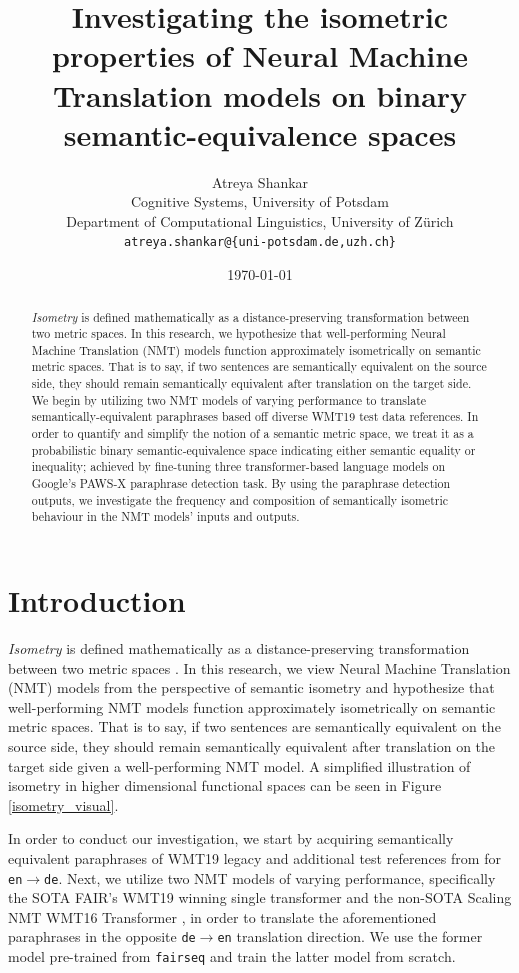 \documentclass[11pt,a4paper]{article}
\title{Investigating the isometric properties of Neural Machine Translation models on binary semantic-equivalence spaces}
\author{Atreya Shankar \\
  Cognitive Systems, University of Potsdam \\
  Department of Computational Linguistics, University of Zürich \\
  \texttt{atreya.shankar@\{uni-potsdam.de,uzh.ch\}}}
\date{\today}
\begin{document}
\maketitle

\begin{abstract}
  \textit{Isometry} is defined mathematically as a distance-preserving transformation between two metric spaces. In this research, we hypothesize that well-performing Neural Machine Translation (NMT) models function approximately isometrically on semantic metric spaces. That is to say, if two sentences are semantically equivalent on the source side, they should remain semantically equivalent after translation on the target side. We begin by utilizing two NMT models of varying performance to translate semantically-equivalent paraphrases based off diverse WMT19 test data references. In order to quantify and simplify the notion of a semantic metric space, we treat it as a probabilistic binary semantic-equivalence space indicating either semantic equality or inequality; achieved by fine-tuning three transformer-based language models on Google's PAWS-X paraphrase detection task. By using the paraphrase detection outputs, we investigate the frequency and composition of semantically isometric behaviour in the NMT models' inputs and outputs.
\end{abstract}

\section{Introduction}

\textit{Isometry} is defined mathematically as a distance-preserving transformation between two metric spaces \cite{coxeter1961introduction}. In this research, we view Neural Machine Translation (NMT) models from the perspective of semantic isometry and hypothesize that well-performing NMT models function approximately isometrically on semantic metric spaces. That is to say, if two sentences are semantically equivalent on the source side, they should remain semantically equivalent after translation on the target side given a well-performing NMT model. A simplified illustration of isometry in higher dimensional functional spaces can be seen in Figure \ref{isometry_visual}.

In order to conduct our investigation, we start by acquiring semantically equivalent paraphrases of WMT19 legacy and additional test references from \citet{freitag-bleu-paraphrase-references-2020} for \texttt{en$\rightarrow$de}. Next, we utilize two NMT models of varying performance, specifically the SOTA FAIR's WMT19 winning single transformer \cite{ng2019facebook} and the non-SOTA Scaling NMT WMT16 Transformer \cite{ott2018scaling}, in order to translate the aforementioned paraphrases in the opposite \texttt{de$\rightarrow$en} translation direction. We use the former model pre-trained from \texttt{fairseq} \cite{ott2019fairseq} and train the latter model from scratch.
\end{document}
